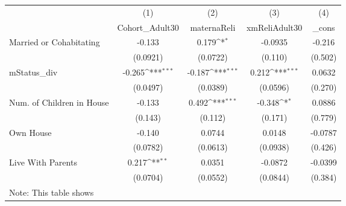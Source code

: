 {
\def\sym#1{\ifmmode^{#1}\else\(^{#1}\)\fi}
\begin{tabular}{l*{4}{c}}
\hline\hline
            &\multicolumn{1}{c}{(1)}&\multicolumn{1}{c}{(2)}&\multicolumn{1}{c}{(3)}&\multicolumn{1}{c}{(4)}\\
            &\multicolumn{1}{c}{Cohort\_Adult30}&\multicolumn{1}{c}{maternaReli}&\multicolumn{1}{c}{xmReliAdult30}&\multicolumn{1}{c}{\_cons}\\
\hline
Married or Cohabitating&      -0.133         &       0.179\sym{*}  &     -0.0935         &      -0.216         \\
            &    (0.0921)         &    (0.0722)         &     (0.110)         &     (0.502)         \\
[1em]
mStatus\_div &      -0.265\sym{***}&      -0.187\sym{***}&       0.212\sym{***}&      0.0632         \\
            &    (0.0497)         &    (0.0389)         &    (0.0596)         &     (0.270)         \\
[1em]
Num. of Children in House&      -0.133         &       0.492\sym{***}&      -0.348\sym{*}  &      0.0886         \\
            &     (0.143)         &     (0.112)         &     (0.171)         &     (0.779)         \\
[1em]
Own House   &      -0.140         &      0.0744         &      0.0148         &     -0.0787         \\
            &    (0.0782)         &    (0.0613)         &    (0.0938)         &     (0.426)         \\
[1em]
Live With Parents&       0.217\sym{**} &      0.0351         &     -0.0872         &     -0.0399         \\
            &    (0.0704)         &    (0.0552)         &    (0.0844)         &     (0.384)         \\
\hline\hline
\multicolumn{5}{l}{\footnotesize Note: This table shows}\\
\end{tabular}
}
